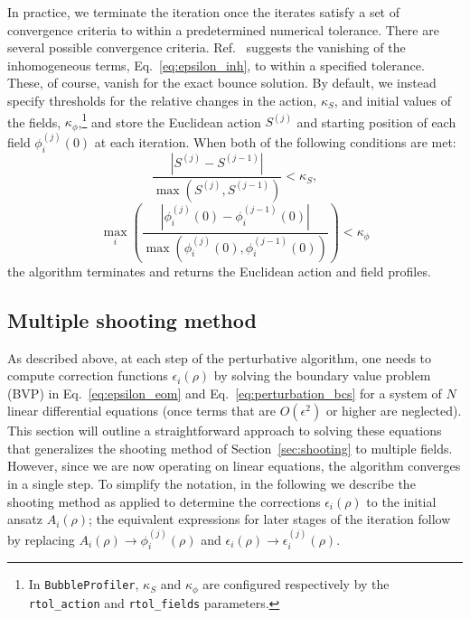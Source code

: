 \documentclass[final,3p,11pt,pdflatex]{elsarticle}
\makeatletter
\newcommand{\bp}{\texttt{BubbleProfiler}\@\xspace}
\newcommand{\code}[1]{\ifmmode\text{\nolinkurl{#1}}\else\nolinkurl{#1}\fi}
\newcommand{\secref}[1]{Section~\ref{#1}}
\renewcommand{\refeq}[1]{Eq.~\ref{#1}}
\newcommand{\refcite}[1]{Ref.~\cite{#1}}
\makeatother
\begin{document}
In practice, we terminate the iteration once the iterates satisfy a set of
convergence criteria to within a predetermined numerical tolerance.
There are several possible convergence criteria.  \refcite{Akula:2016gpl}
suggests the vanishing of the inhomogeneous terms, \refeq{eq:epsilon_inh}, to
within a specified tolerance.  These, of course, vanish for the exact bounce
solution.  By default, we instead specify thresholds for the relative changes
in the action, $\kappa_S$, and initial values of the fields,
$\kappa_\phi$,\footnote{In \bp, $\kappa_S$ and $\kappa_\phi$ are configured
  respectively by the \code{rtol_action} and \code{rtol_fields} parameters.}
and store the Euclidean action $S^{(j)}$ and starting position of each field
$\phi^{(j)}_i(0)$ at each iteration. When both of the following conditions are
met:
%
\begin{equation} \label{eq:convergence_action}
  \frac{\left|S^{(j)} - S^{(j-1)}\right|}{\max\left(S^{(j)},S^{(j-1)}\right)}
  < \kappa_S,
\end{equation}
%
\begin{equation} \label{eq:convergence_fields}
  \max_i \left(\frac{\left|\phi^{(j)}_i(0) - \phi^{(j-1)}_i(0)\right|}{\max
    \left(\phi^{(j)}_i(0), \phi^{(j-1)}_i(0)\right)}\right) < \kappa_\phi
\end{equation}
%
the algorithm terminates and returns the Euclidean action and field profiles.

\subsection{Multiple shooting method}\label{sec:multiple_shooting}

As described above, at each step of the perturbative algorithm, one needs to
compute correction functions $\epsilon_i(\rho)$ by solving the boundary value
problem (BVP) in \refeq{eq:epsilon_eom} and \refeq{eq:perturbation_bcs} for
a system of $N$ linear differential equations (once terms that are
$O(\epsilon^2)$ or higher are neglected).  This section will outline a
straightforward approach to solving these equations that generalizes the
shooting method of \secref{sec:shooting} to multiple fields.  However, since
we are now operating on linear equations, the algorithm converges in a single
step.  To simplify the notation, in the following we describe the shooting
method as applied to determine the corrections $\epsilon_i(\rho)$ to the
initial ansatz $A_i(\rho)$; the equivalent expressions for later stages of
the iteration follow by replacing $A_i(\rho) \rightarrow \phi_i^{(j)}(\rho)$
and $\epsilon_i(\rho) \rightarrow \epsilon_i^{(j)}(\rho)$.
\end{document}
